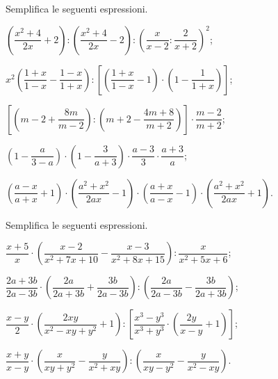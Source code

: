 \begin{esercizio}[\Ast]
\label{ese:14.59}
Semplifica le seguenti espressioni.
\begin{enumeratea}
 \item $\left(\dfrac{x^{2}+4}{2x}+2\right):\left(\dfrac{x^{2}+4}{2x}-2\right):\left(\dfrac{x}{x-2}:\dfrac{2}{x+2}\right)^{2}$;
 \item $x^{2}\left(\dfrac{1+x}{1-x}-\dfrac{1-x}{1+x}\right):\left[\left(\dfrac{1+x}{1-x}-1\right)\cdot\left(1-\dfrac{1}{1+x}\right)\right]$;
 \item $\left[\left(m-2+\dfrac{8m}{m-2}\right):\left(m+2-\dfrac{4m+8}{m+2}\right)\right]\cdot \dfrac{m-2}{m+2}$;
 \item $\left(1-\dfrac{a}{3-a}\right)\cdot\left(1-\dfrac{3}{a+3}\right)\cdot\dfrac{a-3}{3}\cdot\dfrac{a+3}{a}$;
 \item $\left(\dfrac{a-x}{a+x}+1\right)\cdot\left(\dfrac{a^{2}+x^{2}}{2ax}-1\right)\cdot\left(\dfrac{a+x}{a-x}-1\right)\cdot\left(\dfrac{a^{2}+x^{2}}{2ax}+1\right)$.
\end{enumeratea}
\end{esercizio}

\begin{esercizio}[\Ast]
\label{ese:14.60}
Semplifica le seguenti espressioni.
\begin{enumeratea}
 \item $\dfrac{x+5}{x}\cdot\left(\dfrac{x-2}{x^{2}+7x+10}-\dfrac{x-3}{x^{2}+8x+15}\right):\dfrac{x}{x^{2}+5x+6}$;
 \item $\dfrac{2a+3b}{2a-3b}\cdot\left(\dfrac{2a}{2a+3b}+\dfrac{3b}{2a-3b}\right):\left(\dfrac{2a}{2a-3b}-\dfrac{3b}{2a+3b}\right)$;
 \item $\dfrac{x-y}{2}\cdot\left(\dfrac{2xy}{x^{2}-xy+y^{2}}+1\right):\left[\dfrac{x^{3}-y^{3}}{x^{3}+y^{3}}\cdot\left(\dfrac{2y}{x-y}+1\right)\right]$;
 \item $\dfrac{x+y}{x-y}\cdot\left(\dfrac{x}{xy+y^{2}}-\dfrac{y}{x^{2}+xy}\right):\left(\dfrac{x}{xy-y^{2}}-\dfrac{y}{x^{2}-xy}\right)$.
\end{enumeratea}
\end{esercizio}


